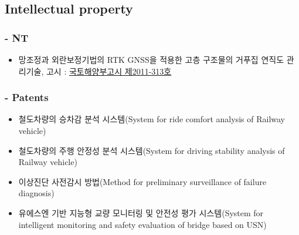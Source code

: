 \subsection*{Intellectual property}

\subsubsection*{ - NT}
\begin{itemize}
\item 망조정과 외란보정기법의 RTK GNSS을 적용한 고층 구조물의 거푸집 연직도 관리기술, 고시 : \href{http://www.kaia.re.kr/portal/newtec/view.do?searchCnd=1\&searchWrd=\&menuNo=200075\&frApntYear=\&toApntYear=\&pageUnit=10\&frApntNo=\&toApntNo=\&cate1=\&cate2=\&cate3=\&tecCat1=\&tecCat2=\&tecCat3=\&newtecCat1=\&newtecCat2=\&newtecCat3=\&dvlprNm=\%ED\%95\%9C\%EA\%B5\%AD\%EC\%9C\%A0\%EC\%A7\%80\%EA\%B4\%80\%EB\%A6\%AC\&ordDvs=\&pageIndex=1\&apntNo=625\&frMenu=list}{국토해양부고시
  제2011-313호} 
\end{itemize}

\subsubsection{ - Patents}
\begin{itemize}
\item 철도차량의 승차감 분석 시스템(System for ride comfort analysis of Railway vehicle)
\item 철도차량의 주행 안정성 분석 시스템(System for driving stability analysis of Railway vehicle)
\item 이상진단 사전감시 방법(Method for preliminary surveillance of failure diagnosis)
\item 유에스엔 기반 지능형 교량 모니터링 및 안전성 평가 시스템(System for intelligent monitoring and safety evaluation of bridge based on USN)
\end{itemize}

